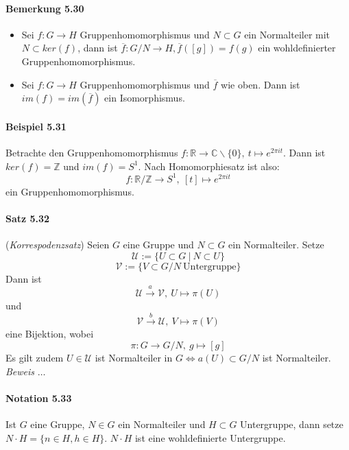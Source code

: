 \documentclass{scrartcl}
\begin{document}
\paragraph{Bemerkung 5.30}
\begin{itemize}
\item Sei $f: G \to H$ Gruppenhomomorphismus und $N \subset
  G$ ein Normalteiler mit $N \subset ker(f)$, dann ist $\overline{f}: G/N \to H,
  \overline{f}([g]) = f(g)$ ein wohldefinierter Gruppenhomomorphismus.
\item Sei $f: G \to H$ Gruppenhomomorphismus und $\overline{f}$ wie oben. Dann
  ist $im(f) = im(\overline{f})$ ein Isomorphismus.
\end{itemize}

\paragraph{Beispiel 5.31} Betrachte den Gruppenhomomorphismus $f: \mathbb{R} \to
\mathbb{C}\backslash\{0\},~t \mapsto e^{2\pi it}$. Dann ist $ker(f) =
\mathbb{Z}$ und $im(f) = S^1$. Nach Homomorphiesatz ist also:
\[
  f: \mathbb{R}/\mathbb{Z} \to S^1,~[t] \mapsto e^{2\pi it}
\]
ein Gruppenhomomorphismus.

\paragraph{Satz 5.32} (\textit{Korrespodenzsatz}) Seien $G$ eine Gruppe und $N
\subset G$ ein Normalteiler. Setze
\[
  \mathcal{U} := \{U \subset G ~|~ N \subset U\}
\]
\[
  \mathcal{V} := \{V \subset G/N ~\text{Untergruppe}\}
\]
Dann ist
\[
  \mathcal{U} \overset{a}{\to} \mathcal{V},~U \mapsto \pi(U)
\]
und
\[
  \mathcal{V} \overset{b}{\to} \mathcal{U},~V \mapsto \pi(V)
\]
eine Bijektion, wobei
\[
  \pi: G \to G/N,~g \mapsto [g]
\]
Es gilt zudem $U \in \mathcal{U}$ ist Normalteiler in $G \Leftrightarrow a(U)
\subset G/N$ ist Normalteiler. \\
\textit{Beweis} $\dots$

\paragraph{Notation 5.33} Ist $G$ eine Gruppe, $N \in G$ ein Normalteiler und $H
\subset G$ Untergruppe, dann setze $N \cdot H = \{n \in H, h \in H\}$. $N \cdot
H$ ist eine wohldefinierte Untergruppe.
\end{document}
